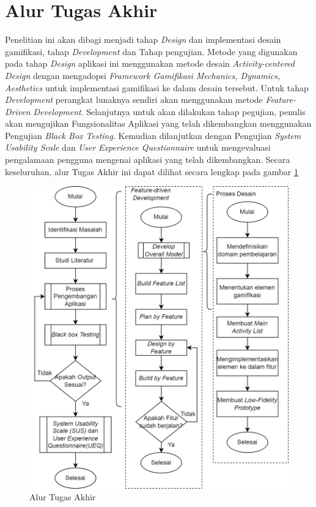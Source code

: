 \section{Alur Tugas Akhir}
Penelitian ini akan dibagi menjadi tahap \textit{Design} dan implementasi desain gamifikasi, tahap \textit{Development} dan Tahap pengujian.
Metode yang digunakan pada tahap \textit{Design} aplikasi ini menggunakan metode desain \textit{Activity-centered Design} 
dengan mengadopsi \textit{Framework Gamifikasi Mechanics, Dynamics, Aesthetics} untuk implementasi gamifikasi ke dalam desain tersebut.
Untuk tahap \textit{Development} perangkat lunaknya sendiri akan menggunakan metode \textit{Feature-Driven Development}.
Selanjutnya untuk akan dilakukan tahap pegujian, penulis akan mengujikan Fungsionalitas Aplikasi yang telah dikembangkan menggunakan Pengujian \textit{Black Box Testing}.
Kemudian dilanjutkan dengan Pengujian \textit{System Usability Scale} dan \textit{User Experience Questionnaire} untuk mengevaluasi pengalamaan pengguna mengenai aplikasi yang telah dikembangkan.
Secara keseluruhan, alur Tugas Akhir ini dapat dilihat secara lengkap pada gambar \ref{Fig:Alur Tugas Akhir}
\begin{figure}[H]
	\centering
	\includegraphics[width=\textwidth-1cm]{contents/chapter-3/images/Alur-tugas-akhir-2.png}
	\caption{Alur Tugas Akhir}
	\label{Fig:Alur Tugas Akhir}
\end{figure}
